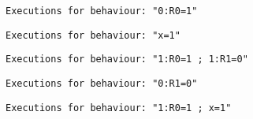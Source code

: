 \def\csname images-BASIC-img-RW\endcsname{
\begin{verbatim}
Executions for behaviour: "0:R0=1"
\end{verbatim}
 }%
\def\csname images-BASIC-img-WW\endcsname{
\begin{verbatim}
Executions for behaviour: "x=1"
\end{verbatim}
 }%
\def\csname images-BASIC-img-W+RR\endcsname{
\begin{verbatim}
Executions for behaviour: "1:R0=1 ; 1:R1=0"
\end{verbatim}
 }%
\def\csname images-BASIC-img-WR\endcsname{
\begin{verbatim}
Executions for behaviour: "0:R1=0"
\end{verbatim}
 }%
\def\csname images-BASIC-img-W+RW\endcsname{
\begin{verbatim}
Executions for behaviour: "1:R0=1 ; x=1"
\end{verbatim}
 }%
